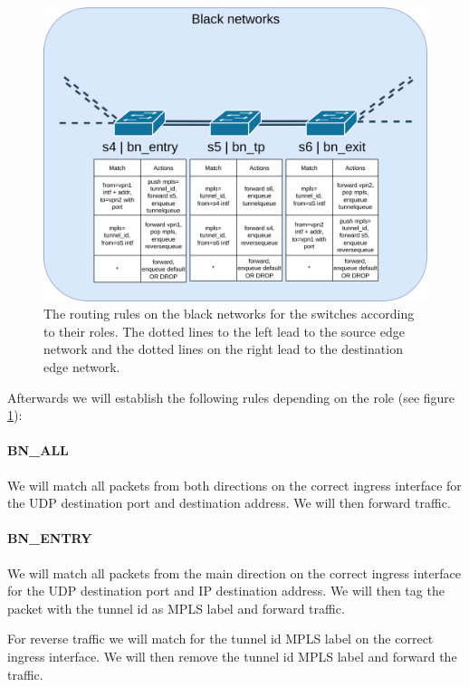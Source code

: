 \begin{figure}[ht]
  \centering
  \includegraphics[width=\linewidth]{images/chapter_6/routing_bn.png}
  \caption[Routing on the black networks]{The routing rules on the black networks for the switches according to their roles. The dotted lines to the left lead to the source edge network and the dotted lines on the right lead to the destination edge network.}
  \label{fig:routing_bn}
\end{figure}

Afterwards we will establish the following rules depending on the role (see figure \ref{fig:routing_bn}):

\paragraph{BN\_ALL} We will match all packets from both directions on the correct ingress interface for the UDP destination port and destination address. We will then forward traffic.

\paragraph{BN\_ENTRY} We will match all packets from the main direction on the correct ingress interface for the UDP destination port and IP destination address. We will then tag the packet with the tunnel id as MPLS label and forward traffic.

For reverse traffic we will match for the tunnel id MPLS label on the correct ingress interface. We will then remove the tunnel id MPLS label and forward the traffic.

